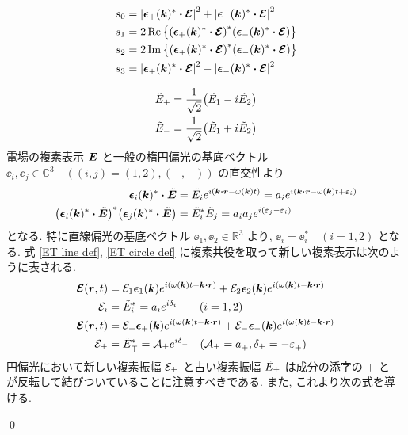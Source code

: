 \documentclass[uplatex,dvipdfmx,a4paper,11pt]{jlreq}
\makeatletter
\newcommand{\CC}{\mathbb{C}}
\newcommand{\RR}{\mathbb{R}}
\newcommand{\rr}{\bm{r}}
\newcommand{\kk}{\bm{k}}
\theoremstyle{definition}
\renewenvironment{proof}[1][\proofname]{\par
  \normalfont
  \topsep6\p@\@plus6\p@ \trivlist
  \item[\hskip\labelsep{\bfseries #1}\@addpunct{\bfseries}]\ignorespaces\quad\par
}{%
  \qed\endtrivlist\@endpefalse
}
\renewcommand\proofname{証明}
\makeatother
\begin{document}
\begin{proposition}
  \begin{align}
    s_0 & = \qty|\ee_+(\kk)^*\vdot\EC|^2 + \qty|\ee_-(\kk)^*\vdot\EC|^2      \\
    s_1 & = 2\Re\qty{\qty(\ee_+(\kk)^*\vdot\EC)^*\qty(\ee_-(\kk)^*\vdot\EC)} \\
    s_2 & = 2\Im\qty{\qty(\ee_+(\kk)^*\vdot\EC)^*\qty(\ee_-(\kk)^*\vdot\EC)} \\
    s_3 & = \qty|\ee_+(\kk)^*\vdot\EC|^2 - \qty|\ee_-(\kk)^*\vdot\EC|^2
  \end{align}
\end{proposition}
\begin{proof}
  \begin{align}
    \tilde{E}_+ & = \frac{1}{\sqrt{2}}\qty(\tilde{E}_1 - i\tilde{E}_2) \\
    \tilde{E}_- & = \frac{1}{\sqrt{2}}\qty(\tilde{E}_1 + i\tilde{E}_2)
  \end{align}
  電場の複素表示 $\tilde{\bm{E}}$ と一般の楕円偏光の基底ベクトル $\ee_i, \ee_j\in\CC^3\quad ((i, j) = (1, 2), (+, -))$ の直交性より
  \begin{align}
    \ee_i(\kk)^*\vdot\ET
     & = \Et_ie^{\ii(\kk\vdot\rr - \omega(\kk)t)} = a_ie^{\ii(\kk\vdot\rr - \omega(\kk)t + \varepsilon_i)} \\
    \qty(\ee_i(\kk)^*\vdot\ET)^*\qty(\ee_j(\kk)^*\vdot\ET)
     & = \Et_i^*\Et_j = a_ia_je^{\ii(\varepsilon_j - \varepsilon_i)} \label{Ei Ej}
  \end{align}
  となる. 特に直線偏光の基底ベクトル $\ee_1, \ee_2\in\RR^3$ より, $\ee_i = \ee_i^*\quad(i=1,2)$ となる.
  式 \eqref{ET line def}, \eqref{ET circle def} に複素共役を取って新しい複素表示は次のように表される.
  \begin{align}
    \EC(\rr, t) & = \Ec_1\ee_1(\kk)e^{\ii(\omega(\kk)t - \kk\vdot\rr)} + \Ec_2\ee_2(\kk)e^{\ii(\omega(\kk)t - \kk\vdot\rr)}      \\
    \Ec_i       & = \Et_i^* = a_ie^{\ii\delta_i} \qquad (i = 1, 2)                                                               \\
    \EC(\rr, t) & = \Ec_+\ee_+(\kk)e^{\ii(\omega(\kk)t - \kk\vdot\rr)} + \Ec_-\ee_-(\kk)e^{\ii(\omega(\kk)t - \kk\vdot\rr)}      \\
    \Ec_\pm     & = \Et_\mp^* = \mathcal{A}_\pm e^{\ii\delta_\pm} \quad (\mathcal{A}_\pm = a_\mp, \delta_\pm = -\varepsilon_\mp)
  \end{align}
  円偏光において新しい複素振幅 $\mathcal{E}_\pm$ と古い複素振幅 $\tilde{E}_\pm$ は成分の添字の $+$ と $-$ が反転して結びついていることに注意すべきである. また, これより次の式を導ける.

\end{proof}
\end{document}
